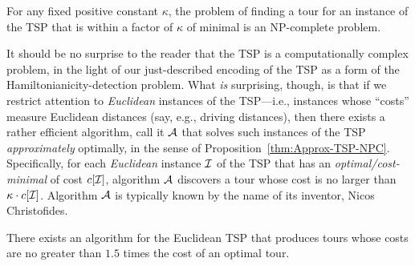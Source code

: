 \begin{prop}
\label{thm:Approx-TSP-NPC}
For any fixed positive constant $\kappa$, the problem of finding a tour for an instance of the TSP that is within a factor of $\kappa$ of minimal is an {\sf NP}-complete problem.
\end{prop}


It should be no surprise to the reader that the TSP is a computationally complex problem, in the light of our just-described encoding of the TSP as a form of the Hamiltonianicity-detection problem.  What {\em is} surprising, though, is that if we restrict attention to {\em Euclidean} instances of the TSP---i.e., instances whose ``costs'' measure Euclidean distances (say, e.g.,
driving distances), then there exists a rather efficient algorithm, call it $\mbox{$\cal A$}$ that solves such instances of the TSP {\em approximately} optimally, in the sense of Proposition~\ref{thm:Approx-TSP-NPC}.  Specifically, for each {\em Euclidean} instance $\mbox{$\cal I$}$ of the TSP that has an {\em optimal/cost-minimal} of cost $c[\mbox{$\cal I$}]$, algorithm $\mbox{$\cal A$}$ discovers a tour whose cost is no larger than $\kappa \cdot c[\mbox{$\cal I$}]$.  Algorithm $\mbox{$\cal A$}$ is typically known by the name of its inventor, Nicos Christofides.


\begin{prop}
There exists an algorithm for the Euclidean TSP that produces tours whose costs are no greater than $1.5$ times the cost of an optimal tour.
\end{prop}

